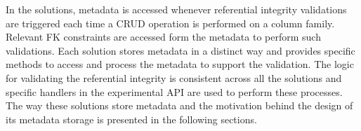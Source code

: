 In the solutions, metadata  is accessed whenever referential integrity
validations are triggered each time 
 a \ac{CRUD} operation is
performed on a column family. Relevant \ac{FK} constraints are accessed form the
metadata to perform such validations. Each solution stores metadata in a
distinct way and provides specific methods to access and process the metadata to
support the validation. The logic for validating the referential integrity is
consistent across all the solutions and specific handlers  in the
experimental \ac{API} are used to perform these processes. The way these
solutions store metadata and the motivation
behind the design of its metadata storage is presented in the following
sections.










